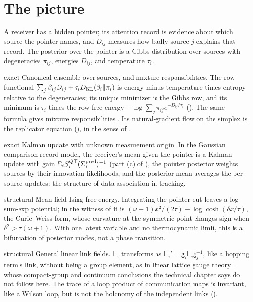 \section{The picture}
\label{comp:ch06-picture}

A receiver has a hidden pointer; its attention record is evidence about which source the pointer names, and
$D_{ij}$ measures how badly source $j$ explains that record. The posterior over the pointer is a Gibbs distribution
over sources with degeneracies $\pi_{ij}$, energies $D_{ij}$, and temperature $\tau_i$.

\begin{analogy}{exact}
Canonical ensemble over sources, and mixture responsibilities. The row functional
$\sum_j\beta_{ij}D_{ij}+\tau_iD_{\mathrm{KL}}(\beta_i\Vert\pi_i)$ is energy minus temperature times entropy relative to the
degeneracies; its unique minimizer is the Gibbs row, and its minimum is $\tau_i$ times the row free energy
$-\log\sum_j\pi_{ij}e^{-D_{ij}/\tau_i}$ (). The same formula gives mixture
responsibilities \citep{Bishop2006}. Its natural-gradient flow on the simplex is the replicator equation
(), in the sense of \citet{Amari1998}.
\end{analogy}

\begin{analogy}{exact}
Kalman update with unknown measurement origin. In the Gaussian comparison-record model, the receiver's mean given
the pointer is a Kalman update with gain $\Sigma_iS_i^{Q\top}(\Sigma^{\rm pred}_i)^{-1}$ (part (c) of
), the pointer posterior weights sources by their innovation likelihoods,
and the posterior mean averages the per-source updates: the structure of data association in tracking.
\end{analogy}

\begin{analogy}{structural}
Mean-field Ising free energy. Integrating the pointer out leaves a log-sum-exp potential; in the witness of
 it is $(\omega+1)x^2/(2\tau)-\log\cosh(\delta x/\tau)$, the Curie--Weiss
form, whose curvature at the symmetric point changes sign when $\delta^2>\tau(\omega+1)$. With one latent variable
and no thermodynamic limit, this is a bifurcation of posterior modes, not a phase transition.
\end{analogy}

\begin{analogy}{structural}
General linear link fields. $\mathsf L_e$ transforms as $\mathsf L_e'=\mathsf g_i\mathsf L_e\mathsf g_j^{-1}$, like a
hopping term's link, without being a group element, as in linear lattice gauge theory
\citep{Wetterich2014LinearLattice}, whose compact-group and continuum conclusions the technical chapter says do not
follow here. The trace of a loop product of communication maps is invariant, like a Wilson loop, but is not the
holonomy of the independent links ().
\end{analogy}

